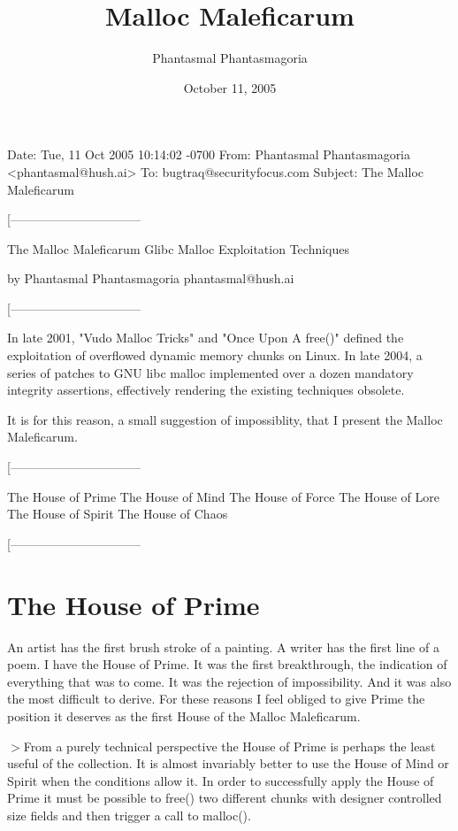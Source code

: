 \documentclass[12pt]{article}
\begin{document}
\title{Malloc Maleficarum}
\author{Phantasmal Phantasmagoria}
\date{October 11, 2005}
\maketitle
\begin{verbnobox}[\small]
Date: Tue, 11 Oct 2005 10:14:02 -0700
From: Phantasmal Phantasmagoria <phantasmal@hush.ai>
To: bugtraq@securityfocus.com
Subject: The Malloc Maleficarum

[--------------------------------

The Malloc Maleficarum
Glibc Malloc Exploitation Techniques

by Phantasmal Phantasmagoria
phantasmal@hush.ai

[--------------------------------
\end{verbnobox}
In late 2001, "Vudo Malloc Tricks" and "Once Upon A free()" defined
the exploitation of overflowed dynamic memory chunks on Linux. In
late 2004, a series of patches to GNU libc malloc implemented over
a dozen mandatory integrity assertions, effectively rendering the
existing techniques obsolete.
\newline


It is for this reason, a small suggestion of impossiblity, that I
present the Malloc Maleficarum.
\begin{verbnobox}[\small]
[--------------------------------

          The House of Prime
          The House of Mind
          The House of Force
          The House of Lore
          The House of Spirit
          The House of Chaos

[--------------------------------
\end{verbnobox}

\section{The House of Prime}

An artist has the first brush stroke of a painting. A writer has
the first line of a poem. I have the House of Prime. It was the
first breakthrough, the indication of everything that was to come.
It was the rejection of impossibility. And it was also the most
difficult to derive. For these reasons I feel obliged to give Prime
the position it deserves as the first House of the Malloc
Maleficarum.
\newline


$>$From a purely technical perspective the House of Prime is perhaps
the least useful of the collection. It is almost invariably better
to use the House of Mind or Spirit when the conditions allow it. In
order to successfully apply the House of Prime it must be possible
to free() two different chunks with designer controlled size fields
and then trigger a call to malloc().
\newline
\end{document}
